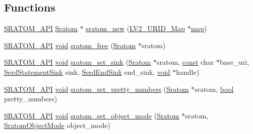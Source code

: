 \subsection*{Functions}
\begin{DoxyCompactItemize}
\item 
\hyperlink{sratom_8h_a985b35a1a85570afea3bd031d6c8e72d}{S\+R\+A\+T\+O\+M\+\_\+\+A\+PI} \hyperlink{group__sratom_gaff6a49d547dbfe9f8d910f9b1ae98494}{Sratom} $\ast$ \hyperlink{group__sratom_ga6ca41eacfb303961a39e4b8c18f728df}{sratom\+\_\+new} (\hyperlink{urid_8h_afefb42cd271f750506a8739f73c098c5}{L\+V2\+\_\+\+U\+R\+I\+D\+\_\+\+Map} $\ast$\hyperlink{structmap}{map})
\item 
\hyperlink{sratom_8h_a985b35a1a85570afea3bd031d6c8e72d}{S\+R\+A\+T\+O\+M\+\_\+\+A\+PI} \hyperlink{sound_8c_ae35f5844602719cf66324f4de2a658b3}{void} \hyperlink{group__sratom_ga4d805918e1d89ce8cc30005c3d6a08e5}{sratom\+\_\+free} (\hyperlink{group__sratom_gaff6a49d547dbfe9f8d910f9b1ae98494}{Sratom} $\ast$sratom)
\item 
\hyperlink{sratom_8h_a985b35a1a85570afea3bd031d6c8e72d}{S\+R\+A\+T\+O\+M\+\_\+\+A\+PI} \hyperlink{sound_8c_ae35f5844602719cf66324f4de2a658b3}{void} \hyperlink{group__sratom_ga657cee72c5d1916da976c108bef687c7}{sratom\+\_\+set\+\_\+sink} (\hyperlink{group__sratom_gaff6a49d547dbfe9f8d910f9b1ae98494}{Sratom} $\ast$sratom, \hyperlink{getopt1_8c_a2c212835823e3c54a8ab6d95c652660e}{const} char $\ast$base\+\_\+uri, \hyperlink{group__serd_ga9cd6dc709f738ed9770d0d2cd1195bd4}{Serd\+Statement\+Sink} sink, \hyperlink{group__serd_gae67888543462e4127e6a4f6af047026b}{Serd\+End\+Sink} end\+\_\+sink, \hyperlink{sound_8c_ae35f5844602719cf66324f4de2a658b3}{void} $\ast$handle)
\item 
\hyperlink{sratom_8h_a985b35a1a85570afea3bd031d6c8e72d}{S\+R\+A\+T\+O\+M\+\_\+\+A\+PI} \hyperlink{sound_8c_ae35f5844602719cf66324f4de2a658b3}{void} \hyperlink{group__sratom_ga0d93ebb102d9d1e033ed826c5119d2ca}{sratom\+\_\+set\+\_\+pretty\+\_\+numbers} (\hyperlink{group__sratom_gaff6a49d547dbfe9f8d910f9b1ae98494}{Sratom} $\ast$sratom, \hyperlink{mac_2config_2i386_2lib-src_2libsoxr_2soxr-config_8h_abb452686968e48b67397da5f97445f5b}{bool} pretty\+\_\+numbers)
\item 
\hyperlink{sratom_8h_a985b35a1a85570afea3bd031d6c8e72d}{S\+R\+A\+T\+O\+M\+\_\+\+A\+PI} \hyperlink{sound_8c_ae35f5844602719cf66324f4de2a658b3}{void} \hyperlink{group__sratom_gad4f459e8c541f9bf303e105aea323198}{sratom\+\_\+set\+\_\+object\+\_\+mode} (\hyperlink{group__sratom_gaff6a49d547dbfe9f8d910f9b1ae98494}{Sratom} $\ast$sratom, \hyperlink{group__sratom_gaf476c91b166a55d78e4aa7fc2213182f}{Sratom\+Object\+Mode} object\+\_\+mode)

\end{DoxyCompactItemize}
